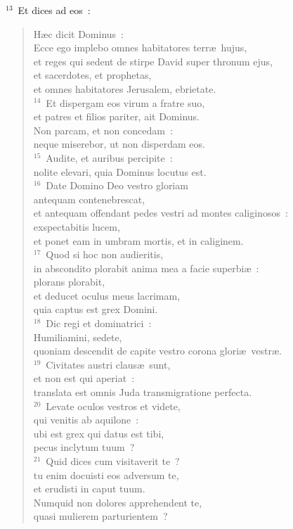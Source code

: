 ${}^{13}$~Et dices ad eos~: \begin{verse}H\ae c dicit Dominus~:\\ Ecce ego implebo omnes habitatores terr\ae\ hujus,\\ et reges qui sedent de stirpe David super thronum ejus,\\ et sacerdotes, et prophetas,\\ et omnes habitatores Jerusalem, ebrietate.\\
${}^{14}$~Et dispergam eos virum a fratre suo,\\ et patres et filios pariter, ait Dominus.\\ Non parcam, et non concedam~:\\ neque miserebor, ut non disperdam eos.\\
${}^{15}$~Audite, et auribus percipite~:\\ nolite elevari, quia Dominus locutus est.\\
${}^{16}$~Date Domino Deo vestro gloriam\\ antequam contenebrescat,\\ et antequam offendant pedes vestri ad montes caliginosos~:\\ exspectabitis lucem,\\ et ponet eam in umbram mortis, et in caliginem.\\
${}^{17}$~Quod si hoc non audieritis,\\ in abscondito plorabit anima mea a facie superbi\ae~:\\ plorans plorabit,\\ et deducet oculus meus lacrimam,\\ quia captus est grex Domini.\\
${}^{18}$~Dic regi et dominatrici~:\\ Humiliamini, sedete,\\ quoniam descendit de capite vestro corona glori\ae\ vestr\ae .\\
${}^{19}$~Civitates austri claus\ae\ sunt,\\ et non est qui aperiat~:\\ translata est omnis Juda transmigratione perfecta.\\
${}^{20}$~Levate oculos vestros et videte,\\ qui venitis ab aquilone~:\\ ubi est grex qui datus est tibi,\\ pecus inclytum tuum~?\\
${}^{21}$~Quid dices cum visitaverit te~?\\ tu enim docuisti eos adversum te,\\ et erudisti in caput tuum.\\ Numquid non dolores apprehendent te,\\ quasi mulierem parturientem~?\\

\end{verse}
